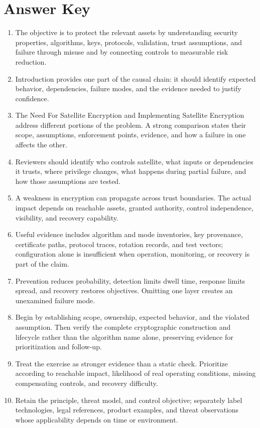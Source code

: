 \documentclass[11pt,letterpaper]{article}
\begin{document}
\section*{Answer Key}
\begin{enumerate}
\item The objective is to protect the relevant assets by understanding security properties, algorithms, keys, protocols, validation, trust assumptions, and failure through misuse and by connecting controls to measurable risk reduction.
\item Introduction provides one part of the causal chain: it should identify expected behavior, dependencies, failure modes, and the evidence needed to justify confidence.
\item The Need For Satellite Encryption and Implementing Satellite Encryption address different portions of the problem. A strong comparison states their scope, assumptions, enforcement points, evidence, and how a failure in one affects the other.
\item Reviewers should identify who controls satellite, what inputs or dependencies it trusts, where privilege changes, what happens during partial failure, and how those assumptions are tested.
\item A weakness in encryption can propagate across trust boundaries. The actual impact depends on reachable assets, granted authority, control independence, visibility, and recovery capability.
\item Useful evidence includes algorithm and mode inventories, key provenance, certificate paths, protocol traces, rotation records, and test vectors; configuration alone is insufficient when operation, monitoring, or recovery is part of the claim.
\item Prevention reduces probability, detection limits dwell time, response limits spread, and recovery restores objectives. Omitting one layer creates an unexamined failure mode.
\item Begin by establishing scope, ownership, expected behavior, and the violated assumption. Then verify the complete cryptographic construction and lifecycle rather than the algorithm name alone, preserving evidence for prioritization and follow-up.
\item Treat the exercise as stronger evidence than a static check. Prioritize according to reachable impact, likelihood of real operating conditions, missing compensating controls, and recovery difficulty.
\item Retain the principle, threat model, and control objective; separately label technologies, legal references, product examples, and threat observations whose applicability depends on time or environment.
\end{enumerate}
\end{document}
